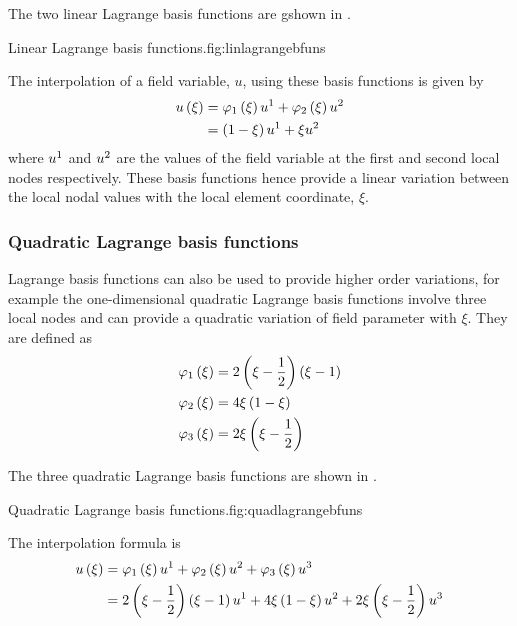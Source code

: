 The two \onedal linear Lagrange basis functions are gshown in .

{Linear Lagrange basis functions.}{fig:linlagrangebfuns}

The interpolation of a field variable, $u$, using these basis functions is
given by
\begin{equation}
  \begin{split}
     u\left( \xi \right) &=   \varphi_{1} \left( \xi \right)   {u}^{1} +   \varphi_{2} \left( \xi \right)   {u}^{2}  \\
    &=\left( 1-\xi \right) {u}^{1} +\xi {u}^{2} 
  \end{split}
\end{equation}
where $ {u}^{1} $ and $ {u}^{2} $ are the values of the field variable at
the first and second local nodes respectively. These basis functions hence
provide a linear variation between the local nodal values with the local
element coordinate, $\xi$.

\subsubsection{Quadratic Lagrange basis functions}

Lagrange basis functions can also be used to provide higher order variations,
for example the one-dimensional quadratic Lagrange basis functions involve
three local nodes and can provide a quadratic variation of field parameter
with $\xi$. They are defined as
\begin{equation}
  \begin{split}
    \lbfn{1}{\xi}&=2\pbrac{\xi-\frac12}\pbrac{\xi-1} \\
    \lbfn{2}{\xi}&=4\xi\pbrac{1-\xi} \\
    \lbfn{3}{\xi}&=2\xi\pbrac{\xi-\frac12}
  \end{split}
  \label{eqn:quadraticlbfuns}
\end{equation}

The three \onedal quadratic Lagrange basis functions are shown in .

{Quadratic Lagrange basis functions.}{fig:quadlagrangebfuns}

The interpolation formula is
\begin{equation}
  \begin{split}
     u\left( \xi \right) &=   \varphi_{1} \left( \xi \right)   {u}^{1} +   \varphi_{2} \left( \xi \right)   {u}^{2} +
       \varphi_{3} \left( \xi \right)   {u}^{3} \\
    &=2\left( \xi-\frac12 \right)\left( \xi-1 \right) {u}^{1} +
    4\xi\left( 1-\xi \right) {u}^{2} +2\xi\left( \xi-\frac12 \right) {u}^{3} 
  \end{split}
\end{equation}

